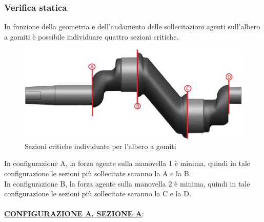 \subsubsection{Verifica statica}
In funzione della geometria e dell'andamento delle sollecitazioni agenti sull'albero a gomiti è possibile individuare quattro sezioni critiche.
\begin{figure}[h]
    \centering
    \includegraphics[scale=0.25]{Immagini/SezioniCriticheAlbero.png}
    \caption{Sezioni critiche individuate per l'albero a gomiti}
    \label{fig:SezioniCriticheAlbero}
\end{figure}

In configurazione A, la forza agente sulla manovella 1 è minima, quindi in tale configurazione le sezioni più sollecitate saranno la A e la B.\\
In configurazione B, la forza agente sulla manovella 2 è minima, quindi in tale configurazione le sezioni più sollecitate saranno la C e la D.\\
\\
\underline{\textbf{CONFIGURAZIONE A, SEZIONE A}}:

